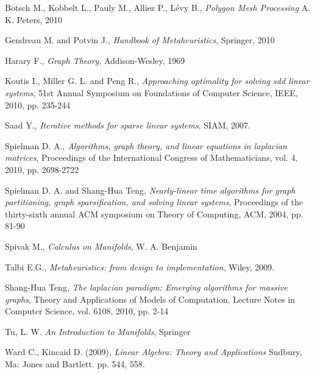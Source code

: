 \documentclass[conference,compsoc,a4paper]{IEEEtran}
\begin{document}
\begin{thebibliography}{1}

Botsch M., Kobbelt L., Pauly M., Alliez P., Lévy B.,
\newblock \textit{Polygon Mesh Processing}
\newblock A. K. Peters, 2010

Gendreau M. and Potvin J., 
\newblock \textit{Handbook of Metaheuristics}, 
\newblock Springer, 2010

Harary F., 
\newblock \textit{Graph Theory}, 
\newblock Addison-Wesley, 1969

Koutis I., Miller G. L. and Peng R., 
\newblock \textit{Approaching optimality for solving sdd linear systems}, 
\newblock 51st Annual Symposium on Foundations of Computer Science, IEEE, 
2010, pp. 235-244

Saad Y., 
\newblock \textit{Iterative methods for sparse linear systems}, 
\newblock SIAM, 2007.

Spielman D. A.,
\newblock \textit{Algorithms, graph theory, and linear equations in laplacian 
matrices}, 
\newblock Proceedings of the International Congress of Mathematicians, vol. 4, 
2010, pp. 2698-2722

Spielman D. A. and Shang-Hua Teng,
\newblock \textit{Nearly-linear time algorithms for graph partitioning, graph 
sparsification, and solving linear systems}, 
\newblock Proceedings of the thirty-sixth annual ACM symposium on Theory of 
Computing, ACM, 2004, pp. 81-90

Spivak M.,
\newblock \textit{Calculus on Manifolds},
\newblock W. A. Benjamin

Talbi E.G., 
\newblock \textit{Metaheuristics: from design to implementation}, 
\newblock Wiley, 2009.

Shang-Hua Teng,
\newblock \textit{The laplacian paradigm: Emerging algorithms for massive 
graphs}, 
\newblock Theory and Applications of Models of Computation, Lecture Notes in 
Computer Science, vol. 6108, 2010, pp. 2-14

Tu, L. W. 
\newblock \textit{An Introduction to Manifolds},
\newblock Springer

Ward C., Kincaid D. (2009), 
\newblock \textit{Linear Algebra: Theory and Applications}
\newblock Sudbury, Ma: Jones and Bartlett. pp. 544, 558.



\end{thebibliography}




\end{document}
